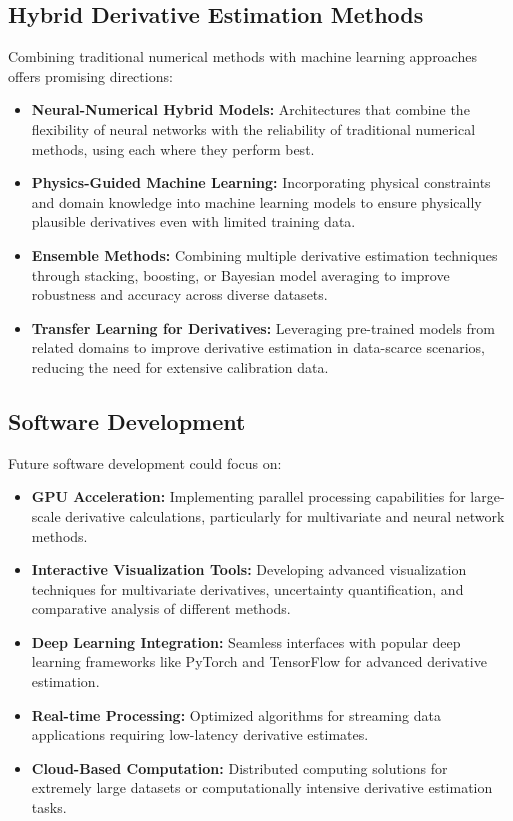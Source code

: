 \documentclass{article}
\begin{document}
\subsection{Hybrid Derivative Estimation Methods}

Combining traditional numerical methods with machine learning approaches offers promising directions:

\begin{itemize}
    \item \textbf{Neural-Numerical Hybrid Models:} Architectures that combine the flexibility of neural networks with the reliability of traditional numerical methods, using each where they perform best.
    
    \item \textbf{Physics-Guided Machine Learning:} Incorporating physical constraints and domain knowledge into machine learning models to ensure physically plausible derivatives even with limited training data.
    
    \item \textbf{Ensemble Methods:} Combining multiple derivative estimation techniques through stacking, boosting, or Bayesian model averaging to improve robustness and accuracy across diverse datasets.
    
    \item \textbf{Transfer Learning for Derivatives:} Leveraging pre-trained models from related domains to improve derivative estimation in data-scarce scenarios, reducing the need for extensive calibration data.
\end{itemize}

\subsection{Software Development}

Future software development could focus on:

\begin{itemize}
    \item \textbf{GPU Acceleration:} Implementing parallel processing capabilities for large-scale derivative calculations, particularly for multivariate and neural network methods.
    
    \item \textbf{Interactive Visualization Tools:} Developing advanced visualization techniques for multivariate derivatives, uncertainty quantification, and comparative analysis of different methods.
    
    \item \textbf{Deep Learning Integration:} Seamless interfaces with popular deep learning frameworks like PyTorch and TensorFlow for advanced derivative estimation.
    
    \item \textbf{Real-time Processing:} Optimized algorithms for streaming data applications requiring low-latency derivative estimates.
    
    \item \textbf{Cloud-Based Computation:} Distributed computing solutions for extremely large datasets or computationally intensive derivative estimation tasks.
\end{itemize}
\end{document}
